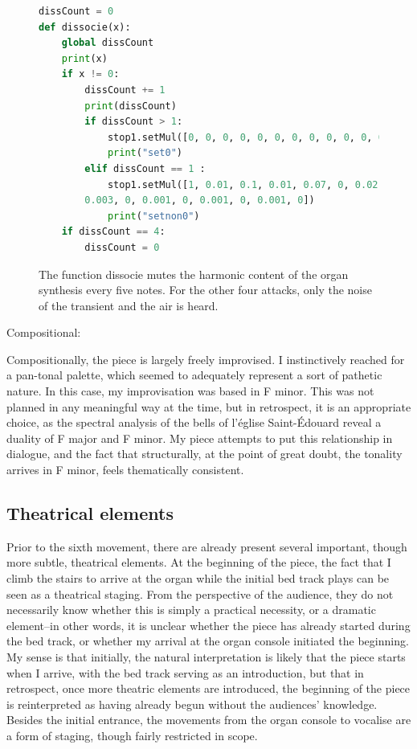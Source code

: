 \documentclass[12pt,twoside,maitrise]{dms_ks}
\theoremstyle{definition}
\begin{document}
\begin{figure}[H]
\begin{lstlisting}[language=Python]
dissCount = 0
def dissocie(x):
    global dissCount
    print(x)
    if x != 0:
        dissCount += 1
        print(dissCount)
        if dissCount > 1:
            stop1.setMul([0, 0, 0, 0, 0, 0, 0, 0, 0, 0, 0, 0, 0, 0, 0, 0, 0, 0, 0, 0])
            print("set0")
        elif dissCount == 1 :
            stop1.setMul([1, 0.01, 0.1, 0.01, 0.07, 0, 0.02, 0, 0.01, 0, 0.003, 0,
	    0.003, 0, 0.001, 0, 0.001, 0, 0.001, 0])
            print("setnon0")
    if dissCount == 4:
        dissCount = 0
\end{lstlisting}
\caption{The function dissocie mutes the harmonic content of the organ synthesis every five notes.
For the other four attacks, only the noise of the transient and the air is heard.}
\end{figure}

Compositional:

Compositionally, the piece is largely freely improvised.
I instinctively reached for a pan-tonal palette, which seemed to adequately represent a sort of pathetic nature.
In this case, my improvisation was based in F minor.
This was not planned in any meaningful way at the time, but in retrospect, it is an appropriate choice, as the spectral analysis of the bells of l'église Saint-Édouard reveal a duality of F major and F minor.
My piece attempts to put this relationship in dialogue, and the fact that structurally, at the point of great doubt, the tonality arrives in F minor, feels thematically consistent.

\subsection{Theatrical elements}

Prior to the sixth movement, there are already present several important, though more subtle, theatrical elements.
At the beginning of the piece, the fact that I climb the stairs to arrive at the organ while the initial bed track plays can be seen as a theatrical staging.
From the perspective of the audience, they do not necessarily know whether this is simply a practical necessity, or a dramatic element--in other words, it is unclear whether the piece has already started during the bed track, or whether my arrival at the organ console initiated the beginning.
My sense is that initially, the natural interpretation is likely that the piece starts when I arrive, with the bed track serving as an introduction, but that in retrospect, once more theatric elements are introduced, the beginning of the piece is reinterpreted as having already begun without the audiences' knowledge.
Besides the initial entrance, the movements from the organ console to vocalise are a form of staging, though fairly restricted in scope.
\end{document}
